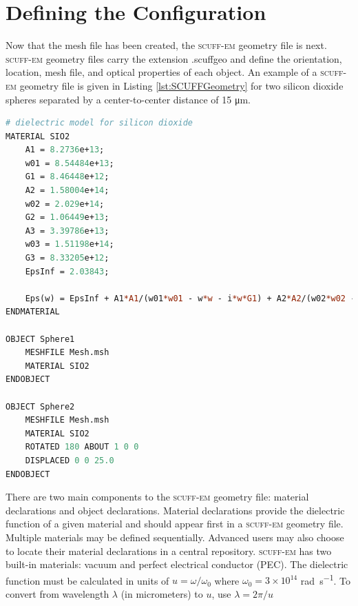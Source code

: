 \section{Defining the Configuration}
%
Now that the mesh file has been created, the \textsc{scuff-em} geometry file is next. \textsc{scuff-em} geometry files carry the extension .scuffgeo and define the orientation, location, mesh file, and optical properties of each object. An example of a \textsc{scuff-em} geometry file is given in Listing \ref{lst:SCUFFGeometry} for two silicon dioxide spheres separated by a center-to-center distance of 15 \si{\micro\meter}.

\singlespacing
\begin{lstlisting}[language=Perl, caption={\textsc{scuff-em} geometry file.}, label={lst:SCUFFGeometry}]
# dielectric model for silicon dioxide
MATERIAL SIO2
	A1 = 8.2736e+13;
 	w01 = 8.54484e+13;
 	G1 = 8.46448e+12;
 	A2 = 1.58004e+14;
 	w02 = 2.029e+14;
 	G2 = 1.06449e+13;
 	A3 = 3.39786e+13;
 	w03 = 1.51198e+14;
 	G3 = 8.33205e+12;
 	EpsInf = 2.03843;
 
 	Eps(w) = EpsInf + A1*A1/(w01*w01 - w*w - i*w*G1) + A2*A2/(w02*w02 - w*w - i*w*G2) + A3*A3/(w03*w03 - w*w - i*w*G3);
ENDMATERIAL

OBJECT Sphere1
	MESHFILE Mesh.msh
	MATERIAL SIO2
ENDOBJECT

OBJECT Sphere2
	MESHFILE Mesh.msh
	MATERIAL SIO2
	ROTATED 180 ABOUT 1 0 0
	DISPLACED 0 0 25.0
ENDOBJECT
\end{lstlisting}
\doublespacing

There are two main components to the \textsc{scuff-em} geometry file: material declarations and object declarations. Material declarations provide the dielectric function of a given material and should appear first in a \textsc{scuff-em} geometry file. Multiple materials may be defined sequentially. Advanced users may also choose to locate their material declarations in a central repository. \textsc{scuff-em} has two built-in materials: vacuum and perfect electrical conductor (PEC). The dielectric function must be calculated in units of $u = \omega/\omega_{0}$ where $\omega_{0} = 3 \times 10^{14}$ \si{\radian\per\second}. To convert from wavelength $\lambda$ (in micrometers) to $u$, use $\lambda = 2\pi/u$

